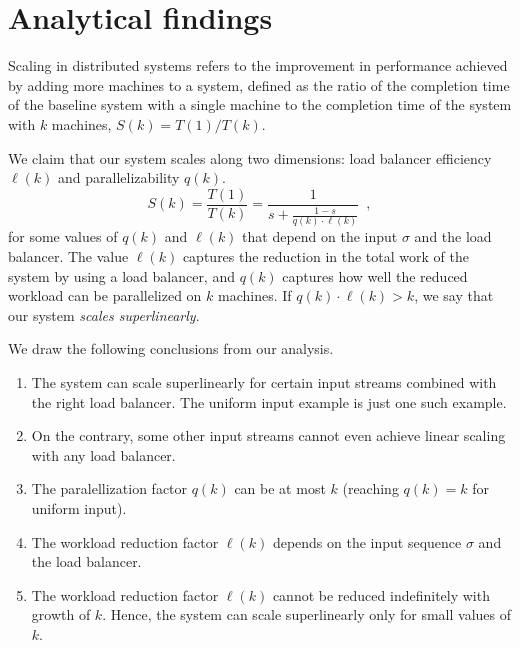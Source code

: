 \appendix

\newpage
\section{Analytical findings}

Scaling in distributed systems refers to the improvement in performance achieved by adding more machines to a system, defined as the ratio of the completion time of the baseline system with a single machine to the completion time of the system with $k$ machines, $S(k) = T(1) / T(k)$.


We claim that our system scales along two dimensions: load balancer efficiency $\ell(k)$ and parallelizability $q(k)$.
\begin{displaymath}
    S(k) = \frac{T(1)}{T(k)} = \frac{1}{s + \frac{1-s}{q(k) \cdot \ell(k)}} \enspace ,
\end{displaymath}
for some values of $q(k)$ and $\ell(k)$ that depend on the input $\sigma$ and the load balancer.
The value $\ell(k)$ captures the reduction in the total work of the system by using a load balancer, and $q(k)$ captures how well the reduced workload can be parallelized on $k$ machines.
If $q(k) \cdot \ell(k) > k$, we say that our system \emph{scales superlinearly}.


We draw the following conclusions from our analysis.
\begin{enumerate}
	\item The system can scale superlinearly for certain input streams combined with the right load balancer.
		The uniform input example is just one such example.
	\item On the contrary, some other input streams cannot even achieve linear scaling with any load balancer.
	\item The paralellization factor $q(k)$ can be at most $k$ (reaching $q(k)=k$ for uniform input).
	\item The workload reduction factor $\ell(k)$ depends on the input sequence $\sigma$ and the load balancer.
	\item The workload reduction factor $\ell(k)$ cannot be reduced indefinitely with growth of $k$. Hence, the system can scale superlinearly only for small values of $k$. 
\end{enumerate} 


